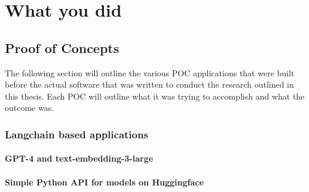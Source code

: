 ﻿\chapter{What you did}
\label{ch:whatYouDid}










\section{Proof of Concepts}


The following section will outline the various \gls{POC} applications that were built before the actual software that was written to conduct the research outlined in this thesis. Each \gls{POC} will outline what it was trying to accomplish and what the outcome was.


\subsection{Langchain based applications}


\subsubsection{GPT-4 and text-embedding-3-large}


\subsubsection{Simple Python API for models on Huggingface}


